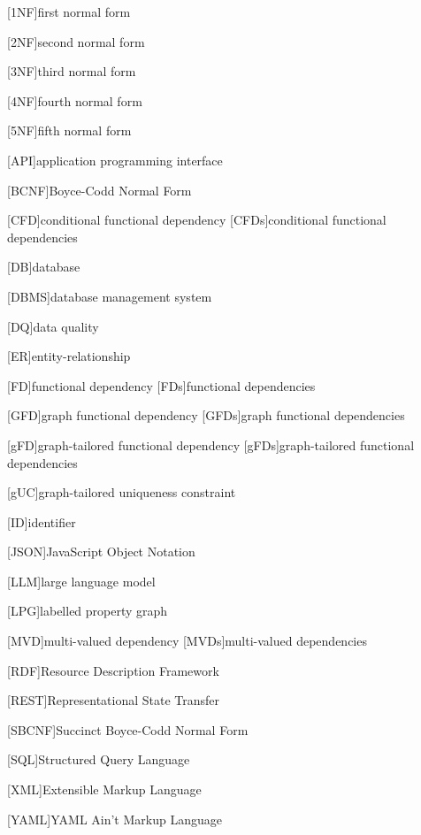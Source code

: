 \begin{acronym}

[1NF]{first normal form}

[2NF]{second normal form}

[3NF]{third normal form}

[4NF]{fourth normal form}

[5NF]{fifth normal form}

[API]{application programming interface}

[BCNF]{Boyce-Codd Normal Form}

[CFD]{conditional functional dependency}
[CFDs]{conditional functional dependencies}

[DB]{database}

[DBMS]{database management system}

[DQ]{data quality}

[ER]{entity-relationship}

[FD]{functional dependency}
[FDs]{functional dependencies}

[GFD]{graph functional dependency}
[GFDs]{graph functional dependencies}

[gFD]{graph-tailored functional dependency}
[gFDs]{graph-tailored functional dependencies}

[gUC]{graph-tailored uniqueness constraint}

[ID]{identifier}

[JSON]{JavaScript Object Notation}

[LLM]{large language model}

[LPG]{labelled property graph}

[MVD]{multi-valued dependency}
[MVDs]{multi-valued dependencies}

[RDF]{Resource Description Framework}

[REST]{Representational State Transfer}

[SBCNF]{Succinct Boyce-Codd Normal Form} %

[SQL]{Structured Query Language}

[XML]{Extensible Markup Language}

[YAML]{YAML Ain't Markup Language}

\end{acronym}
